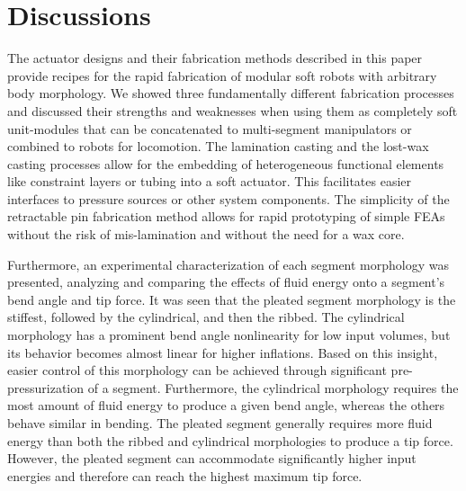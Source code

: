 \section{Discussions}
\label{sec:discussions}
The actuator designs and their fabrication methods described in this paper provide recipes for the rapid fabrication of modular soft robots with arbitrary body morphology.
%
We showed three fundamentally different fabrication processes and discussed their strengths and weaknesses when using them as completely soft unit-modules that can be concatenated to multi-segment manipulators or combined to robots for locomotion.
%
The lamination casting and the lost-wax casting processes allow for the embedding of heterogeneous functional elements like constraint layers or tubing into a soft actuator.
This facilitates easier interfaces to pressure sources or other system components. 
The simplicity of the retractable pin fabrication method allows for rapid prototyping of simple FEAs without the risk of mis-lamination and without the need for a wax core.  

Furthermore, an experimental characterization of each segment morphology was presented, analyzing and comparing the effects of fluid energy onto a segment's bend angle and tip force. 
It was seen that the pleated segment morphology is the stiffest, followed by the cylindrical, and then the ribbed. 
The cylindrical morphology has a prominent bend angle nonlinearity for low input volumes, but its behavior becomes almost linear for higher inflations. 
Based on this insight, easier control of this morphology can be achieved through significant pre-pressurization of a segment.
Furthermore, the cylindrical morphology requires the most amount of fluid energy to produce a given bend angle, whereas the others behave similar in bending.
The pleated segment generally requires more fluid energy than both the ribbed and cylindrical morphologies to produce a tip force. 
However, the pleated segment can accommodate significantly higher input energies and therefore can reach the highest maximum tip force. 

